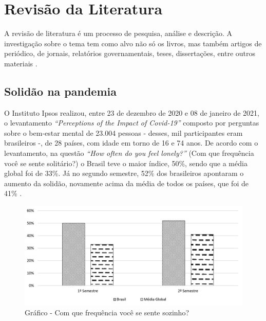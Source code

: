 \chapter{Revisão da Literatura}
\label{revisao-literatura}

A revisão de literatura é um processo de pesquisa, análise e descrição. A investigação sobre o tema tem como alvo não só os livros, mas também artigos de periódico, de jornais, relatórios governamentais, teses, dissertações, entre outros materiais \cite{revisao}.



\section{Solidão na pandemia}
O Instituto Ipsos realizou, entre 23 de dezembro de 2020 e 08 de janeiro de 2021, o levantamento \textit{“Perceptions of the Impact of Covid-19”} composto por perguntas sobre o bem-estar mental de 23.004 pessoas - desses, mil participantes eram brasileiros -, de 28 países, com idade em torno de 16 e 74 anos. De acordo com o levantamento, na questão \textit{“How often do you feel lonely?”} (Com que frequência você se sente solitário?) o Brasil teve o maior índice, 50\%, sendo que a média global foi de 33\%. Já no segundo semestre, 52\% dos brasileiros apontaram o aumento da solidão, novamente acima da média de todos os países, que foi de 41\% \cite{solidaoIPSOS}.
\begin{figure}[htb]
    \centering
    \caption{\label{grafico-ipsos}Gráfico - Com que frequência você se sente sozinho?}
	\includegraphics[width=1\textwidth]{imagens/graficoIPSOS.png}
\end{figure}

